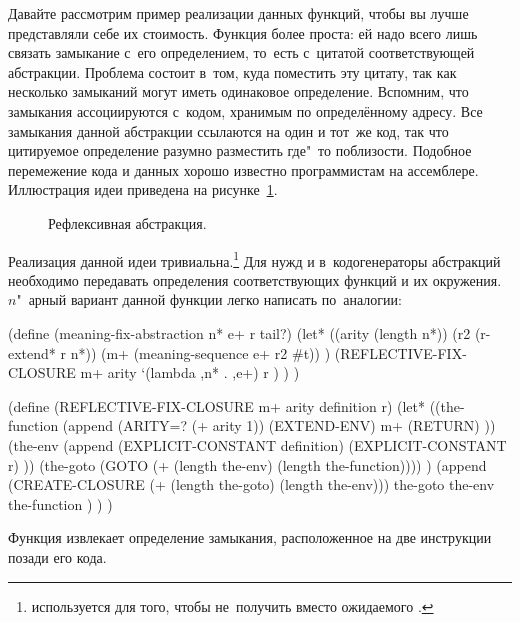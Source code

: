 Давайте рассмотрим пример реализации данных функций, чтобы вы лучше представляли
себе их стоимость. Функция  более проста: ей надо
всего лишь связать замыкание с~его определением, то~есть с~цитатой
соответствующей абстракции. Проблема состоит в~том, куда поместить эту цитату,
так как несколько замыканий могут иметь одинаковое определение. Вспомним, что
замыкания ассоциируются с~кодом, хранимым по определённому адресу. Все замыкания
данной абстракции ссылаются на один и тот~же код, так что цитируемое определение
разумно разместить где"~то поблизости. Подобное перемежение кода и данных хорошо
известно программистам на ассемблере. Иллюстрация идеи приведена на
рисунке~\ref{reflection/reify-env/closed/pic:subj}.

\begin{figure}\begin{center}

\end{center}%
\caption{Рефлексивная абстракция.}%
\label{reflection/reify-env/closed/pic:subj}%
\end{figure}

Реализация данной идеи тривиальна.\footnote*{ используется
для того, чтобы не~получить  вместо ожидаемого
.} Для нужд  и
 в~кодогенераторы абстракций необходимо передавать
определения соответствующих функций и их окружения. $n$"~арный вариант данной
функции легко написать по~аналогии:

\begin{code:lisp}
(define (meaning-fix-abstraction n* e+ r tail?)
  (let* ((arity (length n*))
         (r2 (r-extend* r n*))
         (m+ (meaning-sequence e+ r2 #t)) )
    (REFLECTIVE-FIX-CLOSURE m+ arity
      `(lambda ,n* . ,e+) r ) ) )

(define (REFLECTIVE-FIX-CLOSURE m+ arity definition r)
  (let* ((the-function (append (ARITY=? (+ arity 1)) (EXTEND-ENV)
                               m+ (RETURN) ))
         (the-env (append (EXPLICIT-CONSTANT definition)
                          (EXPLICIT-CONSTANT r) ))
         (the-goto (GOTO (+ (length the-env) (length the-function)))) )
    (append (CREATE-CLOSURE (+ (length the-goto) (length the-env)))
            the-goto the-env the-function ) ) )
\end{code:lisp}

Функция  извлекает определение замыкания,
расположенное на две инструкции позади его кода.

